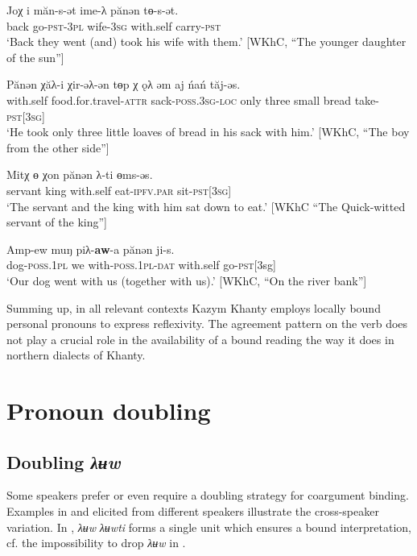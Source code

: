 \documentclass[output=paper]{langscibook}
\begin{document}
 \ea 
\label{ex:Volkova:36}
 \gll Joχ i măn-s-ət ime-λ pănən tɵ-s-ət.\\
 back go\textsc{{}-pst-3pl} wife\textsc{{}-3sg} with.self carry\textsc{{}-pst}\\
 \glt ‘Back they went (and) took his wife with them.’ [WKhC, “The younger daughter of the sun”]
\z




\ea 
\label{ex:Volkova:37}
 \gll Pănən χăλ-i χir-əλ-ən tɵp χ ǫλ əm aj ńań tăj-əs.\\
 with.self food.for.travel\textsc{{}-attr} sack\textsc{{}-poss.3sg-loc} only three small bread take\textsc{{}-pst[3sg]}\\
 \glt ‘‎He took only three little loaves of bread in his sack with him‎.’ [WKhC, “The boy from the other side”]
\z



\ea 
\label{ex:Volkova:38}
 \gll Mitχ ɵ χon pănən λ-ti ɵms-əs.\\
 servant king %
with.self eat\textsc{{}-ipfv.par} sit\textsc{{}-pst[3sg]}
\\
 \glt ‘The servant and the king with him sat down to eat.’ [WKhC “The Quick-witted servant of the king”]
\z

 

 \ea 
\label{ex:Volkova:39}
 \gll Amp-ew muŋ piλ-\textbf{aw}{}-a pănən ji-s.\\
 dog\textsc{{}-poss.1pl} we with\textsc{{}-poss.1pl-dat} with.self go\textsc{{}-pst[}3sg]\\
 \glt ‘Our dog went with us (together with us).’ [WKhC, “On the river bank”]
\z


Summing up, in all relevant contexts Kazym Khanty employs locally bound personal pronouns to express reflexivity. The agreement pattern on the verb does not play a crucial role in the availability of a bound reading the way it does in northern dialects of Khanty.


\section{{Pronoun} doubling}\label{sec:Volkova:4}
\subsection{{Doubling} {\textit{λʉw}}}\label{sec:Volkova:4.1}

Some speakers prefer or even require a doubling strategy for coargument binding. Examples in  and  elicited from different speakers illustrate the cross-speaker variation. In , \textit{ λʉw} \textit{λʉwti} forms a single unit which ensures a bound interpretation, cf. the impossibility to drop \textit{λʉw} in .
\end{document}
